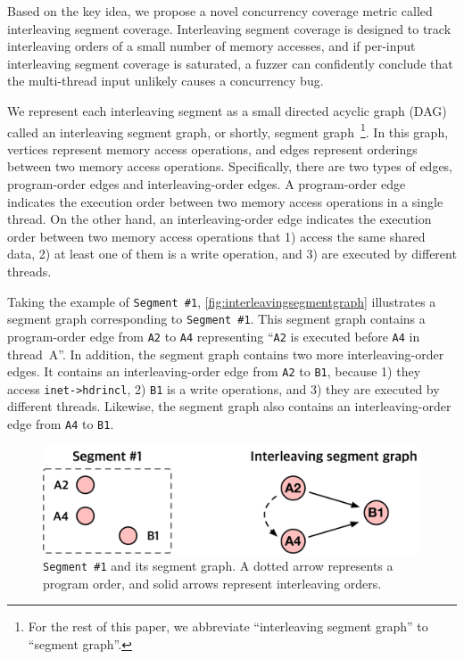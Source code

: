 \newcommand{\mutable}{mutable edge\xspace}
\newcommand{\mutables}{mutable edges\xspace}
\newcommand{\immutable}{immutable edge\xspace}
\newcommand{\immutables}{immutable edges\xspace}

Based on the key idea, we propose a novel concurrency coverage metric
called interleaving segment coverage.
%
Interleaving segment coverage is designed to track interleaving orders
of a small number of memory accesses, and if per-input interleaving
segment coverage is saturated, a fuzzer can confidently conclude that
the multi-thread input unlikely causes a concurrency bug.

%
We represent each interleaving segment as a small directed acyclic
graph (DAG) called an interleaving segment graph, or shortly, segment
graph~\footnote{For the rest of this paper, we abbreviate
  ``interleaving segment graph'' to ``segment graph''.}.
%
In this graph, vertices represent memory access operations, and edges
represent orderings between two memory access operations.
%
Specifically, there are two types of edges, program-order edges and
interleaving-order edges.
%
A program-order edge indicates the execution order between two memory
access operations in a single thread.
%
On the other hand, an interleaving-order edge indicates the execution
order between two memory access operations that 1) access the same
shared data, 2) at least one of them is a write operation, and 3) are
executed by different threads.

Taking the example of \texttt{Segment \#1},
\autoref{fig:interleavingsegmentgraph} illustrates a segment graph
corresponding to \texttt{Segment \#1}.
%
This segment graph contains a program-order edge from \texttt{A2} to
\texttt{A4} representing ``\texttt{A2} is executed before \texttt{A4}
in thread~A''.
%
In addition, the segment graph contains two more interleaving-order
edges. It contains an interleaving-order edge from \texttt{A2} to
\texttt{B1}, because 1) they access \texttt{inet->hdrincl}, 2)
\texttt{B1} is a write operations, and 3) they are executed by
different threads. Likewise, the segment graph also contains an
interleaving-order edge from \texttt{A4} to \texttt{B1}.

\begin{figure}[t]
  \centering
  \includegraphics[width=0.9\linewidth]{fig/interleavingsegmentgraph.pdf}
  \caption{\texttt{Segment \#1} and its segment graph. A
    dotted arrow represents a program order, and solid arrows
    represent interleaving orders.}
  \label{fig:interleavingsegmentgraph}
\end{figure}

